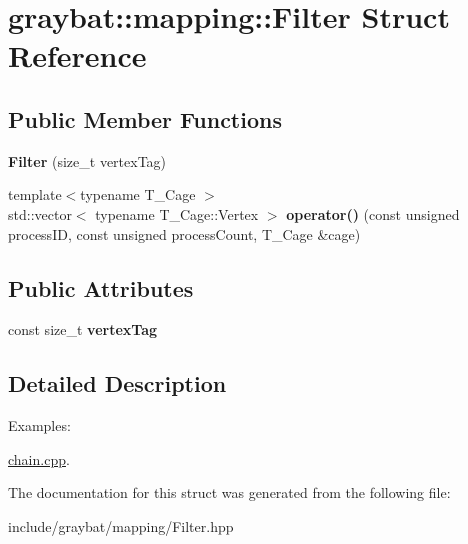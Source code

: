 \hypertarget{structgraybat_1_1mapping_1_1Filter}{}\section{graybat\+:\+:mapping\+:\+:Filter Struct Reference}
\label{structgraybat_1_1mapping_1_1Filter}
\subsection*{Public Member Functions}
\begin{DoxyCompactItemize}
\item 
\hypertarget{structgraybat_1_1mapping_1_1Filter_a0fead0a6f6f68659401d579e53bb8fe9}{}{\bfseries Filter} (size\+\_\+t vertex\+Tag)\label{structgraybat_1_1mapping_1_1Filter_a0fead0a6f6f68659401d579e53bb8fe9}

\item 
\hypertarget{structgraybat_1_1mapping_1_1Filter_a7734ba725c075e7a22ebc1937b85882a}{}{\footnotesize template$<$typename T\+\_\+\+Cage $>$ }\\std\+::vector$<$ typename T\+\_\+\+Cage\+::\+Vertex $>$ {\bfseries operator()} (const unsigned process\+I\+D, const unsigned process\+Count, T\+\_\+\+Cage \&cage)\label{structgraybat_1_1mapping_1_1Filter_a7734ba725c075e7a22ebc1937b85882a}

\end{DoxyCompactItemize}
\subsection*{Public Attributes}
\begin{DoxyCompactItemize}
\item 
\hypertarget{structgraybat_1_1mapping_1_1Filter_a6981ee32a445c93f6687bd940f5450fd}{}const size\+\_\+t {\bfseries vertex\+Tag}\label{structgraybat_1_1mapping_1_1Filter_a6981ee32a445c93f6687bd940f5450fd}

\end{DoxyCompactItemize}


\subsection{Detailed Description}
\begin{Desc}
\item[Examples\+: ]\par
\hyperlink{chain_8cpp-example}{chain.\+cpp}.\end{Desc}


The documentation for this struct was generated from the following file\+:\begin{DoxyCompactItemize}
\item 
include/graybat/mapping/Filter.\+hpp\end{DoxyCompactItemize}
